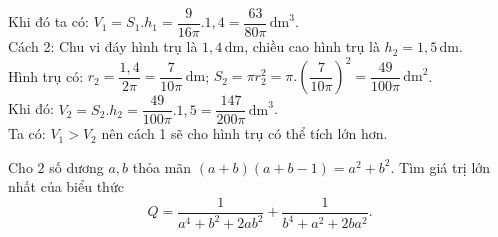 \begin{ex}
{\begin{enumerate}[1.]
		Khi đó ta có: $ V_1=S_1.h_1=\dfrac{9}{16\pi}.1,4=\dfrac{63}{80\pi}\mathrm{\, dm}^3 $.\\
		Cách 2: Chu vi đáy hình trụ là $1,4\mathrm{\, dm}$, chiều cao hình trụ là $ h_2=1,5\mathrm{\, dm}$.\\
		Hình trụ có: $ r_2=\dfrac{1,4}{2\pi}=\dfrac{7}{10\pi}\mathrm{\, dm}$; $ S_2=\pi r_2^2=\pi.\left(\dfrac{7}{10\pi}\right)^2=\dfrac{49}{100\pi}\mathrm{\, dm}^2 $.\\
		Khi đó: $ V_2=S_2.h_2 =\dfrac{49}{100\pi}.1,5=\dfrac{147}{200\pi}\mathrm{\, dm}^3 $.\\
		Ta có: $ V_1>V_2 $ nên cách 1 sẽ cho hình trụ có thể tích lớn hơn.
		
	\end{enumerate}
}	
\end{ex}

\begin{ex}%
	Cho $ 2 $ số dương $ a,b $ thỏa mãn $ (a+b)(a+b-1)=a^2+b^2. $ Tìm giá trị lớn nhất của biểu thức $$Q=\dfrac{1}{a^4+b^2+2ab^2} +\dfrac{1}{b^4+a^2+2ba^2}.$$
\end{ex}

